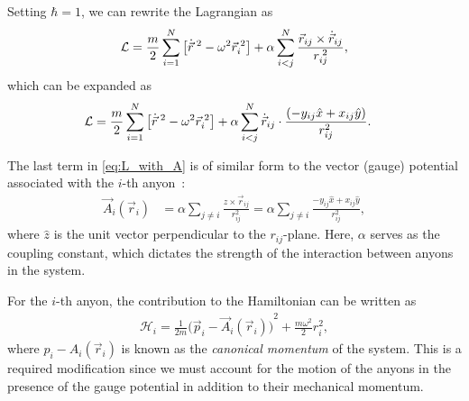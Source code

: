 Setting $\hbar=1$, we can rewrite the Lagrangian as~\cite{Date2003}
\begin{equation}
    \mathcal{L} = \frac{m}{2}\sum_{i=1}^{N}\left[ \dot{\vec{r}}^{\;2} - \omega^2\vec{r}_i^{\;2} \right] + \alpha\sum_{i<j}^{N}\frac{\vec{r}_{ij}\times\dot{\vec{r}}_{ij}}{{r}_{ij}^{\;2}},\label{eq:compact_L}
\end{equation}
which can be expanded as
\begin{align}
    \mathcal{L} &= \frac{m}{2}\sum_{i=1}^{N}\left[ \dot{\vec{r}}^{\;2} - \omega^2\vec{r}_i^{\;2} \right] + \alpha\sum_{i<j}^{N}\dot{\vec{r}}_{ij}\cdot\frac{\left( -y_{ij}\hat{x} + x_{ij}\hat{y} \right)}{r_{ij}^2}.\label{eq:L_with_A}
\end{align}



The last term in \cref{eq:L_with_A} is of similar form to the vector (gauge) potential associated with the $i$-th anyon~\cite{Khare2005,Date2003,Moriyasu1983}:
\begin{align}
    \vec{A}_i(\vec{r}_i) &= \alpha\sum_{j\neq i}\frac{\hat{z}\times \vec{r}_{ij}}{r_{ij}^2} = \alpha\sum_{j\neq i}\frac{-y_{ij}\hat{x} + x_{ij}\hat{y}}{r_{ij}^2}, \label{eq:gauge}
\end{align}
where $\hat{z}$ is the unit vector perpendicular to the $r_{ij}$-plane. Here, $\alpha$ serves as the coupling constant, which dictates the strength of the interaction between anyons in the system.


For the $i$-th anyon, the contribution to the Hamiltonian can be written as
\begin{align}
    \mathcal{H}_i = \frac{1}{2m}{\bigl(\vec{p}_i - \vec{A}_i(\vec{r}_i)\bigr)}^2 + \frac{m\omega^2}{2}{r}_i^{2},
\end{align}
where $p_i - A_i(\vec{r}_i)$ is known as the \textit{canonical momentum} of the system. This is a required modification since we must account for the motion of the anyons in the presence of the gauge potential in addition to their mechanical momentum.

